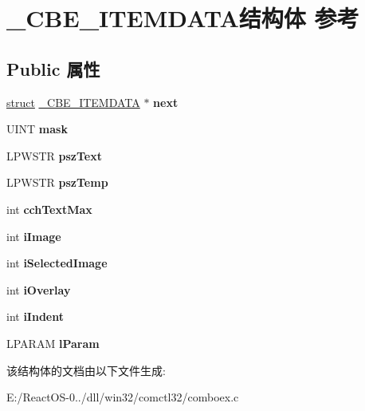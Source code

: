 \hypertarget{struct___c_b_e___i_t_e_m_d_a_t_a}{}\section{\+\_\+\+C\+B\+E\+\_\+\+I\+T\+E\+M\+D\+A\+T\+A结构体 参考}
\label{struct___c_b_e___i_t_e_m_d_a_t_a}
\subsection*{Public 属性}
\begin{DoxyCompactItemize}
\item 
\mbox{\label{struct___c_b_e___i_t_e_m_d_a_t_a_a9ae6d4dcbcc291131600cae1812a696b}} 
\hyperlink{interfacestruct}{struct} \hyperlink{struct___c_b_e___i_t_e_m_d_a_t_a}{\+\_\+\+C\+B\+E\+\_\+\+I\+T\+E\+M\+D\+A\+TA} $\ast$ {\bfseries next}
\item 
\mbox{\label{struct___c_b_e___i_t_e_m_d_a_t_a_a2ee7c504be5e4db0e9c1eba5bc3bb172}} 
U\+I\+NT {\bfseries mask}
\item 
\mbox{\label{struct___c_b_e___i_t_e_m_d_a_t_a_ad1b53463f2bd7ea952e1c81ba5771d7f}} 
L\+P\+W\+S\+TR {\bfseries psz\+Text}
\item 
\mbox{\label{struct___c_b_e___i_t_e_m_d_a_t_a_a49823f1b56852e740e1cb3f7e4f6b1ba}} 
L\+P\+W\+S\+TR {\bfseries psz\+Temp}
\item 
\mbox{\label{struct___c_b_e___i_t_e_m_d_a_t_a_a125592f6964a10dc66bac332f77b68cd}} 
int {\bfseries cch\+Text\+Max}
\item 
\mbox{\label{struct___c_b_e___i_t_e_m_d_a_t_a_ad180bc19c398335ffc59e4cb2ed52348}} 
int {\bfseries i\+Image}
\item 
\mbox{\label{struct___c_b_e___i_t_e_m_d_a_t_a_af785a69359fdc274673cf73aca06895d}} 
int {\bfseries i\+Selected\+Image}
\item 
\mbox{\label{struct___c_b_e___i_t_e_m_d_a_t_a_a9de931be902d4ce5a922007bcfcd2ee9}} 
int {\bfseries i\+Overlay}
\item 
\mbox{\label{struct___c_b_e___i_t_e_m_d_a_t_a_a96b306d4f411020800ed612e575c8f84}} 
int {\bfseries i\+Indent}
\item 
\mbox{\label{struct___c_b_e___i_t_e_m_d_a_t_a_aaaf4715a34cf98802bf731c7e2fb64b9}} 
L\+P\+A\+R\+AM {\bfseries l\+Param}
\end{DoxyCompactItemize}


该结构体的文档由以下文件生成\+:\begin{DoxyCompactItemize}
\item 
E\+:/\+React\+O\+S-\/0../dll/win32/comctl32/comboex.\+c\end{DoxyCompactItemize}
